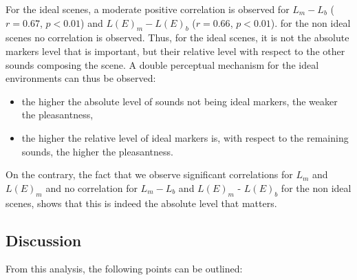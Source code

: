 \documentclass[12pt]{elsarticle}
\begin{document}
For the ideal scenes, a moderate positive correlation is observed for $L_m-L_b$ ($r=0.67$, $p<0.01$) and $L(E)_m-L(E)_b$ ($r=0.66$, $p<0.01$). for the non ideal scenes no correlation is observed. Thus, for the ideal scenes, it is not the absolute markers level that is important, but their relative level with respect to the other sounds composing the scene. A double perceptual mechanism for the ideal environments can thus be observed:


\begin{itemize}
\item the higher the absolute level of sounds not being ideal markers, the weaker the pleasantness,
\item the higher the relative level of ideal markers is, with respect to the remaining sounds, the higher the pleasantness.
\end{itemize}


On the contrary, the fact that we observe significant correlations for $L_m$ and $L(E)_m$ and no correlation for $L_m-L_b$ and $L(E)_m$ - $L(E)_b$ for the non ideal scenes, shows that this is indeed the absolute level that matters.

\subsection{Discussion}


From this analysis, the following points can be outlined:
\end{document}
